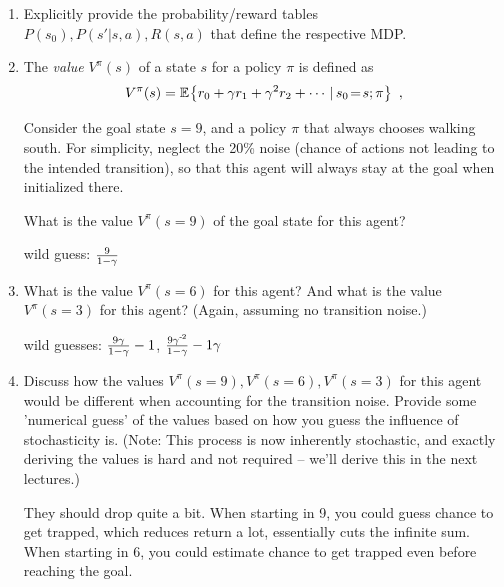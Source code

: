 \begin{enumerate}
\item Explicitly provide the probability/reward tables $P(s_0), P(s'|s,a), R(s,a)$ that define the respective MDP.
\item The \emph{value} $V^\pi(s)$ of a state $s$ for a policy $\pi$ is defined as
$$
V^\pi(s) = \mathbb{E}_{}\!\left\{ r_0 + \gamma r_1 + \gamma^2 r_2 + \cdots \,|\, s_0\!=\!s; \pi \right\}~,
$$

Consider the goal state $s=9$, and a policy $\pi$ that always chooses walking south. For simplicity, neglect the 20\% noise (chance of actions not leading to the intended transition), so that this agent will always stay at the goal when initialized there.

What is the value $V^\pi(s=9)$ of the goal state for this agent?

\begin{solution}
wild guess: $\frac{9}{1-\gamma}$
\end{solution}

\item What is the value $V^\pi(s=6)$ for this agent? And what is the value $V^\pi(s=3)$ for this agent? (Again, assuming no transition noise.)

\begin{solution}
wild guesses: $\frac{9 \gamma}{1-\gamma}-1$, $\frac{9 \gamma^{{\hspace*{-.0pt}\text{\rm -}\hspace*{-.5pt}}2}}{1-\gamma}-1\gamma$
\end{solution}

\item Discuss how the values $V^\pi(s=9), V^\pi(s=6), V^\pi(s=3)$ for this agent would be different when accounting for the transition noise. Provide some 'numerical guess' of the values based on how you guess the influence of stochasticity is. (Note: This process is now inherently stochastic, and exactly deriving the values is hard and not required -- we'll derive this in the next lectures.)

\begin{solution}
They should drop quite a bit. When starting in 9, you could guess chance to get trapped, which reduces return a lot, essentially cuts the infinite sum. When starting in 6, you could estimate chance to get trapped even before reaching the goal.
\end{solution}

\end{enumerate}



